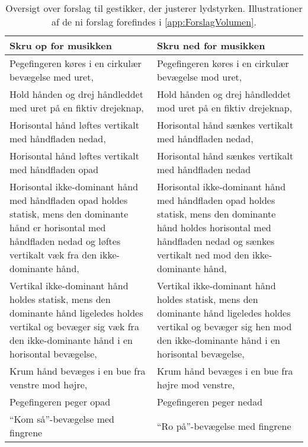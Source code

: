 \begin{table}[H]
	\centering
	\begin{tabular}{| p{6cm} | p{6cm} |}
		\hline
		\textbf{Skru op for musikken} & \textbf{Skru ned for musikken} \\ \hline
		Pegefingeren køres i en cirkulær bevægelse med uret, \parencite{WEB:BeosoundMoment, WEB:BMW7} & Pegefingeren køres i en cirkulær bevægelse mod uret, \parencite{WEB:BeosoundMoment, WEB:BMW7} \\ \hline
		Hold hånden og drej håndleddet med uret på en fiktiv drejeknap, \parencite{WEB:Beosound2} & Hold hånden og drej håndleddet mod uret på en fiktiv drejeknap, \parencite{WEB:Beosound2} \\ \hline
		Horisontal hånd løftes vertikalt med håndfladen nedad, \parencite[s. 166]{PDF:ComparingInputModalities} & Horisontal hånd sænkes vertikalt med håndfladen nedad, \parencite[s. 166]{PDF:ComparingInputModalities} \\ \hline
		Horisontal hånd løftes vertikalt med håndfladen opad & Horisontal hånd sænkes vertikalt med håndfladen nedad \\ \hline
		Horisontal ikke-dominant hånd med håndfladen opad holdes statisk, mens den dominante hånd er horisontal med håndfladen nedad og løftes vertikalt væk fra den ikke-dominante hånd, \parencite[s. 48]{PDF:UserDefinedGesturesTV} & Horisontal ikke-dominant hånd med håndfladen opad holdes statisk, mens den dominante hånd holdes horisontal med håndfladen nedad og sænkes vertikalt ned mod den ikke-dominante hånd, \parencite[s. 48]{PDF:UserDefinedGesturesTV} \\ \hline
		Vertikal ikke-dominant hånd holdes statisk, mens den dominante hånd ligeledes holdes vertikal og bevæger sig væk fra den ikke-dominante hånd i en horisontal bevægelse, \parencite[s. 48]{PDF:UserDefinedGesturesTV} & Vertikal ikke-dominant hånd holdes statisk, mens den dominante hånd ligeledes holdes vertikal og bevæger sig hen mod den ikke-dominante hånd i en horisontal bevægelse, \parencite[s. 48]{PDF:UserDefinedGesturesTV} \\ \hline
		Krum hånd bevæges i en bue fra venstre mod højre, \parencite{WEB:BeoplayA9} & Krum hånd bevæges i en bue fra højre mod venstre, \parencite{WEB:BeoplayA9} \\ \hline
		Pegefingeren peger opad & Pegefingeren peger nedad \\ \hline
		\enquote{Kom så}-bevægelse med fingrene & \enquote{Ro på}-bevægelse med fingrene \\ \hline		
	\end{tabular}
	\caption{Oversigt over forslag til gestikker, der justerer lydstyrken. Illustrationer af de ni forslag forefindes i \autoref{app:ForslagVolumen}.}
	\label{tab:IndsamledeGestikkerVolumen}
\end{table}
